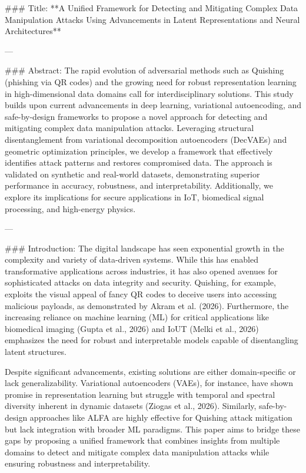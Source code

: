 ### Title:
**A Unified Framework for Detecting and Mitigating Complex Data Manipulation Attacks Using Advancements in Latent Representations and Neural Architectures**

---

### Abstract:
The rapid evolution of adversarial methods such as Quishing (phishing via QR codes) and the growing need for robust representation learning in high-dimensional data domains call for interdisciplinary solutions. This study builds upon current advancements in deep learning, variational autoencoding, and safe-by-design frameworks to propose a novel approach for detecting and mitigating complex data manipulation attacks. Leveraging structural disentanglement from variational decomposition autoencoders (DecVAEs) and geometric optimization principles, we develop a framework that effectively identifies attack patterns and restores compromised data. The approach is validated on synthetic and real-world datasets, demonstrating superior performance in accuracy, robustness, and interpretability. Additionally, we explore its implications for secure applications in IoT, biomedical signal processing, and high-energy physics.

---

### Introduction:
The digital landscape has seen exponential growth in the complexity and variety of data-driven systems. While this has enabled transformative applications across industries, it has also opened avenues for sophisticated attacks on data integrity and security. Quishing, for example, exploits the visual appeal of fancy QR codes to deceive users into accessing malicious payloads, as demonstrated by Akram et al. (2026). Furthermore, the increasing reliance on machine learning (ML) for critical applications like biomedical imaging (Gupta et al., 2026) and IoUT (Melki et al., 2026) emphasizes the need for robust and interpretable models capable of disentangling latent structures.

Despite significant advancements, existing solutions are either domain-specific or lack generalizability. Variational autoencoders (VAEs), for instance, have shown promise in representation learning but struggle with temporal and spectral diversity inherent in dynamic datasets (Ziogas et al., 2026). Similarly, safe-by-design approaches like ALFA are highly effective for Quishing attack mitigation but lack integration with broader ML paradigms. This paper aims to bridge these gaps by proposing a unified framework that combines insights from multiple domains to detect and mitigate complex data manipulation attacks while ensuring robustness and interpretability.

